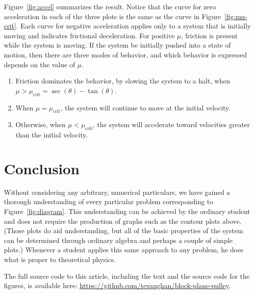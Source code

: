 \documentclass[twocolumn]{article}
\begin{document}
Figure~\ref{fig:accel} summarizes the result. Notice that the curve for zero
acceleration in each of the three plots is the same as the curve in
Figure~\ref{fig:mu-crit}. Each curve for negative acceleration applies only to
a system that is initially moving and indicates frictional deceleration. For
positive $\mu$, friction is present while the system is moving. If the system
be initially pushed into a state of motion, then there are three modes of
behavior, and which behavior is expressed depends on the value of $\mu$.
\begin{enumerate}
   \item Friction dominates the behavior, by slowing the system to a halt, when
      $\mu > \mu_\text{crit} = \sec(\theta) - \tan(\theta)$.
   \item When $\mu = \mu_\text{crit}$, the system will continue to move at the
      initial velocity.
   \item Otherwise, when $\mu < \mu_\text{crit}$, the system will accelerate
      toward velocities greater than the initial velocity.
\end{enumerate}

\section{Conclusion}

Without considering any arbitrary, numerical particulars, we have gained a
thorough understanding of every particular problem corresponding to
Figure~\ref{fig:diagram}. This understanding can be achieved by the ordinary
student and does not require the production of graphs such as the contour plots
above. (Those plots do aid understanding, but all of the basic properties of
the system can be determined through ordinary algebra and perhaps a couple of
simple plots.) Whenever a student applies this same approach to any problem, he
does what is proper to theoretical physics.

The full source code to this article, including the text and the source code
for the figures, is available here:
\url{https://github.com/tevaughan/block-plane-pulley}.

\newpage


\end{document}
